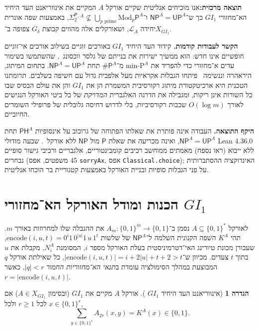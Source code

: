 \documentclass[11pt,a4paper]{article}
\theoremstyle{definition}
\newtheorem{definition}[theorem]{הגדרה}
\theoremstyle{remark}
\newcommand{\Pcl}{\mathsf{P}}
\newcommand{\NP}{\mathsf{NP}}
\newcommand{\UP}{\mathsf{UP}}
\newcommand{\PH}{\mathsf{PH}}
\newcommand{\Modp}{\mathrm{Mod}_p\mathsf{P}}
\newcommand{\SharpP}{\#\mathsf{P}}
\newcommand{\SigTwo}{\Sigma_2^{\mathsf{P}}}
\newcommand{\GI}{GI_1}
\newcommand{\takeaway}[2]{%
  \vspace{4pt}\noindent\colorbox{primary!7}{%
    \parbox{\dimexpr\linewidth-2\fboxsep\relax}{%
      \vspace{3pt}\textbf{\color{primary}#1:}\hspace{0.4em}#2\vspace{3pt}%
    }%
  }\vspace{4pt}%
}
\newcommand{\EN}[1]{\textenglish{#1}}
\begin{document}
\takeaway{תוצאה מרכזית}{אנו מוכיחים אנליטית שקיים אורקל $A$ המקיים את אינווריאנט העד היחיד הא־מחזורי $\GI$ כך ש־$\NP^A = \UP^A$ ו־$\SigTwo{}^{,A} \not\subseteq \bigcup_{p\text{ prime}} \Modp^A$, באמצעות שפה אונרית יחידה $\mathcal{L}_A$, ושאורקלים אלה מהווים קבוצת $G_\delta$ צפופה ב־$X_{\GI}$.}

\textbf{הקשר לעבודות קודמות.} קידוד העד היחיד $\GI$ באורכים זוגיים בשילוב אורכים אי־זוגיים חופשיים אינו חדש: הוא ממשיך ישירות את בנייתם של גלסר ווכסונג~\cite{GlasserWechsung2003}, שהשתמשו בשימור עדים א־מחזורי כדי להפריד את $\mathrm{min\text{-}P}^A$ מ־$\SharpP^A$ תחת $\NP^A = \UP^A$. בתחום המיתוג, היראהרה וננשימה~\cite{HiraharaNanashima2021} פיתחו הגבלות אקראיות מעל אלפבית גדול עם חשיפה בשלבים. תרומתנו הטכנית היא ארכיטקטורת מיתוג רקורסיבית המשמרת הן את $\GI$ והן את עולם הבסיס שבו כל השורות אינן ריקות, ומגבילה את הדרגה האלגברית \emph{המדויקת} של כל ביטי האורקל הנגישים לאורך $O(\log m)$ שכבות רקורסיביות, בלי לדרוש דחיסה גלובלית של פרופילי השומרים החיוביים.

\textbf{היקף התוצאה.} העבודה אינה פותרת את שאלתו הפתוחה של גרוכוב על אינסופיות $\PH^A$ תחת $\NP^A = \UP^A$, ואינה מכריעה את שאלת $\Pcl$ מול $\NP$ ללא אורקל~\cite{Cook2000,RazborovRudich1997}. שבעה מודולי \EN{Lean 4.36.0} ללא ייבוא (ראו נספח) מאמתים ממוחשב רכיבים קומבינטוריים, אלגבריים ורכיבי גישור סופיים נבחרים (45 משפטים, אפס \EN{\texttt{sorryAx}}, אפס \EN{\texttt{Classical.choice}}); האינדוקציה ההסתברותית על פני הגבלות סופיות ובניית האורקל באמצעות קטגוריית בר הוכחו אנליטית.

\section{הכנות ומודל האורקל הא־מחזורי \texorpdfstring{$\GI$}{GI1}}

לאורקל $A \subseteq \{0,1\}^*$ נסמן ב־$A_m : \{0,1\}^m \to \{0,1\}$ את ההגבלה שלו למחרוזות באורך $m$. תהי $K^A$ השפה הקנונית השלמה ל־$\NP^A$ של שלשות $\mathrm{encode}(i, u, t) = 0^i 1\, 0^{|u|} 1\, u\, 1^t$, שעבורן מכונת טיורינג האי־דטרמיניסטית בעלת האורקל מספר $i$, המסומנת $N_i^A$, מקבלת את $u$ בתוך $t$ צעדים. מכיוון ש־$|\mathrm{encode}(i, u, t)| = i + 2|u| + t + 2 > t$, כל שאילתת אורקל $q$ המבוצעת במהלך הסימולציה עומדת ב\emph{תנאי הא־מחזוריות החמור} $|q| < r$, כאשר $r = |\mathrm{encode}(i, u, t)|$.

\begin{definition}[אינווריאנט העד היחיד $\GI$ \cite{GlasserWechsung2003}]
אורקל $A$ מקיים את $\GI$ (ובסימון $A \in X_{\GI}$) אם לכל $r \ge 1$ ולכל $x \in \{0,1\}^r$,
\[
  \sum_{y \in \{0,1\}^r} A_{2r}(x, y) = K^A(x) \in \{0,1\}.
\]
\end{definition}
\end{document}
